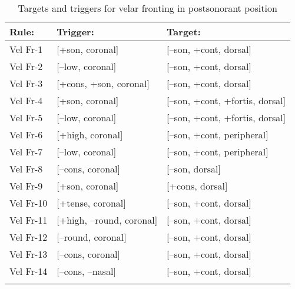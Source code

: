 \begin{table}
\caption{Targets and triggers for velar fronting in postsonorant position}
\begin{tabular}{lll}
\lsptoprule
Rule: & Trigger: & Target:\\\midrule
Vel Fr-1 & [+son, coronal] & [--son, +cont, dorsal]\\
Vel Fr-2 & [--low, coronal] & [--son, +cont, dorsal]\\
Vel Fr-3 & [+cons, +son, coronal] & [--son, +cont, dorsal]\\
Vel Fr-4 & [+son, coronal] & [--son, +cont, +fortis, dorsal]\\
Vel Fr-5 & [--low, coronal] & [--son, +cont, +fortis, dorsal]\\
Vel Fr-6 & [+high, coronal] & [--son, +cont, peripheral]\\
Vel Fr-7 & [--low, coronal] & [--son, +cont, peripheral]\\
Vel Fr-8 & [--cons, coronal] & [--son, dorsal]\\
Vel Fr-9 & [+son, coronal] & [+cons, dorsal]\\
Vel Fr-10 & [+tense, coronal] & [--son, +cont, dorsal]\\
Vel Fr-11 & [+high, --round, coronal] & [--son, +cont, dorsal]\\
Vel Fr-12 & [--round, coronal] & [--son, +cont, dorsal]\\
Vel Fr-13 & [--cons, coronal] & [--son, +cont, dorsal]\\
Vel Fr-14 & [--cons, --nasal] & [--son, +cont, dorsal]\\
\lspbottomrule
\end{tabular}
\end{table}

